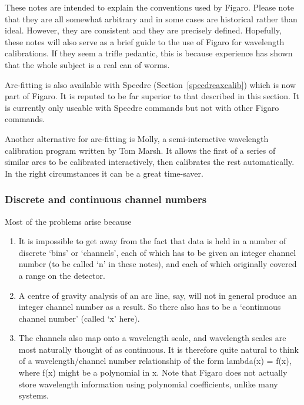 \documentclass[11pt,twoside]{article}
\newcommand{\htmlref}[2]{#1}
\newcommand{\latorhtm}[2]{#1}
\newcommand{\latorhtm}[2]{#2}
\begin{document}
   These notes are intended to explain the conventions used by Figaro.
   Please note that they are all somewhat arbitrary and in some cases
   are historical rather than ideal. However, they are consistent and
   they are precisely defined. Hopefully, these notes will also serve as
   a brief guide to the use of Figaro for wavelength calibrations.  If
   they seem a trifle pedantic, this is because experience has shown
   that the whole subject is a real can of worms.

   Arc-fitting is also available with Specdre
   \latorhtm{(Section~\ref{specdreaxcalib})}
   {(\htmlref{arc spectrum axis calibration}{specdreaxcalib})}
   which is now part of Figaro.
   It is reputed to be far superior to that described in this section.
   It is currently only useable with Specdre commands but not with other
   Figaro commands.

   Another alternative for arc-fitting is
   Molly, a semi-interactive wavelength calibration program written
   by Tom Marsh. It allows the first of a series of similar arcs to be
   calibrated interactively, then calibrates the rest automatically. In
   the right circumstances it can be a great time-saver.


\subsubsection{\label{techno8channels}Discrete and continuous channel numbers}

   Most of the problems arise because

\begin{enumerate}
\item
   It is impossible to get away from the fact that data is held in a
   number of discrete `bins' or `channels', each of which has to be
   given an integer channel number (to be called `n' in these notes),
   and each of which originally covered a range on the detector.
\item
   A centre of gravity analysis of an arc line, say, will not in
   general produce an integer channel number as a result.  So there also
   has to be a `continuous channel number' (called `x' here).
\item
   The channels also map onto a wavelength scale, and wavelength
   scales are most naturally thought of as continuous.  It is therefore
   quite natural to think of a wavelength/channel number relationship of
   the form lambda(x) = f(x), where f(x) might be a polynomial in x.
   Note that Figaro does not actually store wavelength information using
   polynomial coefficients, unlike many systems.
\end{enumerate}
\end{document}
